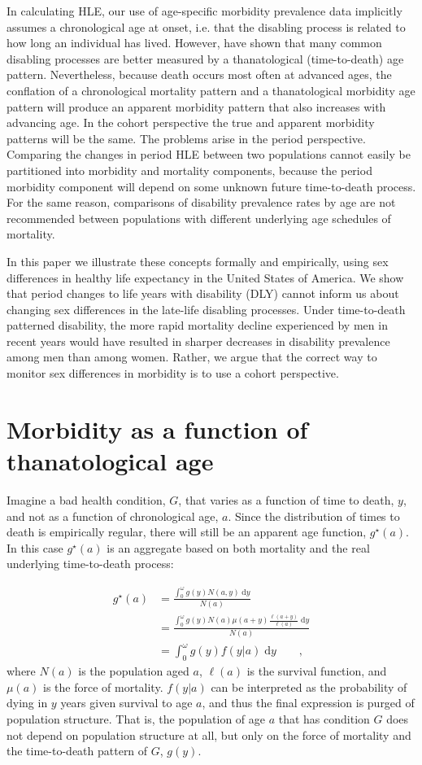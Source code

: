 \documentclass[11pt,oneside,a4paper]{article} %
\newcommand{\dd}{\; \mathrm{d}}
\newcommand{\tc}{\quad\quad\text{,}}
\begin{document}
In calculating HLE, our use of age-specific morbidity prevalence data implicitly assumes a chronological age at onset, i.e. that the disabling process is related to how long an individual has lived. However, \citet{Riffe2015} have shown that many common disabling processes are better measured by a thanatological (time-to-death) age pattern. Nevertheless, because death occurs most often at advanced ages, the conflation of a chronological mortality pattern and a thanatological morbidity age pattern will produce an apparent morbidity pattern that also increases with advancing age. In the cohort perspective the true and apparent morbidity patterns will be the same. The problems arise in the period perspective. Comparing the changes in period HLE between two populations cannot easily be partitioned into morbidity and mortality components, because the period morbidity component will depend on some unknown future time-to-death process. For the same reason, comparisons of disability prevalence rates by age are not recommended between populations with different underlying age schedules of mortality.

In this paper we illustrate these concepts formally and empirically, using sex differences in healthy life expectancy in the United States of America. We show that period changes to life years with disability (DLY) cannot inform us about changing sex differences in the late-life disabling processes. Under time-to-death patterned disability, the more rapid mortality decline experienced by men in recent years would have resulted in sharper decreases in disability prevalence among men than among women. Rather, we argue that the correct way to monitor sex differences in morbidity is to use a cohort perspective.


\section{Morbidity as a function of thanatological age}
 
Imagine a bad health condition, $G$, that varies as a function of time to death,
$y$, and not as a function of chronological age, $a$. Since the distribution of
times to death is empirically regular, there will still be an apparent age
function, $g^\star(a)$.
In this case $g^\star(a)$ is an aggregate based on both mortality and the real underlying time-to-death process:
 
\begin{align}
g^\star(a) &= \frac{\int _0^\omega g(y) N(a,y) \dd y}{N(a)} \\
      &= \frac{\int _0^\omega g(y) N(a)
      \mu(a+y)\frac{\ell(a+y)}{\ell(a)}\dd y}{N(a)}\\
      &= \int _0^\omega g(y) f(y|a)\dd y \tc
\end{align}
where $N(a)$ is the population aged $a$, $\ell(a)$ is the survival function, and
$\mu(a)$ is the force of mortality. $f(y|a)$ can be interpreted as the
probability of dying in $y$ years given survival to age $a$, and thus the final
expression is purged of population structure. That is, the population of age $a$
that has condition $G$ does not depend on population structure at all, but only
on the force of mortality and the time-to-death pattern of $G$, $g(y)$. 
\end{document}
